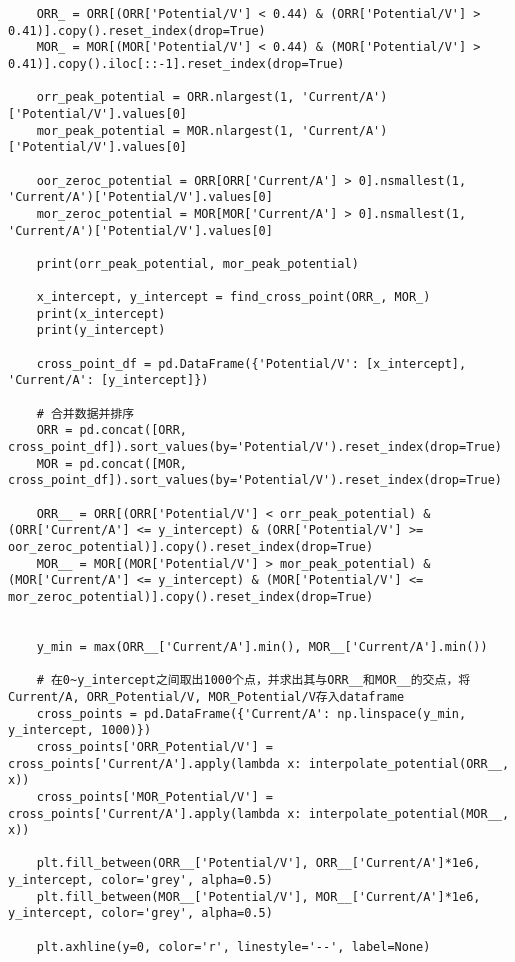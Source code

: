 \begin{verbatim}
    ORR_ = ORR[(ORR['Potential/V'] < 0.44) & (ORR['Potential/V'] > 0.41)].copy().reset_index(drop=True)
    MOR_ = MOR[(MOR['Potential/V'] < 0.44) & (MOR['Potential/V'] > 0.41)].copy().iloc[::-1].reset_index(drop=True)

    orr_peak_potential = ORR.nlargest(1, 'Current/A')['Potential/V'].values[0]
    mor_peak_potential = MOR.nlargest(1, 'Current/A')['Potential/V'].values[0]

    oor_zeroc_potential = ORR[ORR['Current/A'] > 0].nsmallest(1, 'Current/A')['Potential/V'].values[0]
    mor_zeroc_potential = MOR[MOR['Current/A'] > 0].nsmallest(1, 'Current/A')['Potential/V'].values[0]
    
    print(orr_peak_potential, mor_peak_potential)

    x_intercept, y_intercept = find_cross_point(ORR_, MOR_)
    print(x_intercept)
    print(y_intercept)

    cross_point_df = pd.DataFrame({'Potential/V': [x_intercept], 'Current/A': [y_intercept]})

    # 合并数据并排序
    ORR = pd.concat([ORR, cross_point_df]).sort_values(by='Potential/V').reset_index(drop=True)
    MOR = pd.concat([MOR, cross_point_df]).sort_values(by='Potential/V').reset_index(drop=True)
    
    ORR__ = ORR[(ORR['Potential/V'] < orr_peak_potential) & (ORR['Current/A'] <= y_intercept) & (ORR['Potential/V'] >= oor_zeroc_potential)].copy().reset_index(drop=True)
    MOR__ = MOR[(MOR['Potential/V'] > mor_peak_potential) & (MOR['Current/A'] <= y_intercept) & (MOR['Potential/V'] <= mor_zeroc_potential)].copy().reset_index(drop=True)


    y_min = max(ORR__['Current/A'].min(), MOR__['Current/A'].min())

    # 在0~y_intercept之间取出1000个点，并求出其与ORR__和MOR__的交点，将Current/A, ORR_Potential/V, MOR_Potential/V存入dataframe
    cross_points = pd.DataFrame({'Current/A': np.linspace(y_min, y_intercept, 1000)})
    cross_points['ORR_Potential/V'] = cross_points['Current/A'].apply(lambda x: interpolate_potential(ORR__, x))
    cross_points['MOR_Potential/V'] = cross_points['Current/A'].apply(lambda x: interpolate_potential(MOR__, x))

    plt.fill_between(ORR__['Potential/V'], ORR__['Current/A']*1e6, y_intercept, color='grey', alpha=0.5)
    plt.fill_between(MOR__['Potential/V'], MOR__['Current/A']*1e6, y_intercept, color='grey', alpha=0.5)
    
    plt.axhline(y=0, color='r', linestyle='--', label=None)
    

\end{verbatim}
